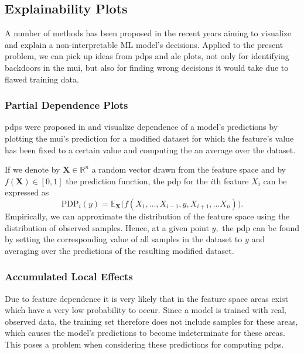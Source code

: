 \documentclass[10pt,sigconf,letterpaper,dvipsnames]{acmart}
\begin{document}
\subsection{Explainability Plots} \label{sec:plots}
A number of methods has been proposed in the recent years aiming to visualize and explain a non-interpretable ML model's decisions.
Applied to the present problem, we can pick up ideas from \glspl{pdp} and \gls{ale} plots, not only for identifying backdoors in the \gls{mui}, but also for finding wrong decisions it would take due to flawed training data.

\subsubsection{Partial Dependence Plots}
\glspl{pdp} were proposed in \cite{friedman_greedy_2001} and visualize dependence of a model's predictions by plotting the \gls{mui}'s prediction for a modified dataset for which the feature's value has been fixed to a certain value and computing the an average over the dataset.

If we denote by $\boldsymbol X \in \mathbb R ^n$ a random vector drawn from the feature space and by $f(\boldsymbol X) \in [0,1]$ the  prediction function, the \gls{pdp} for the $i$th feature $X_i$ can be expressed as
\begin{equation}
\text{PDP}_i(y) = \mathbb E_{\boldsymbol X}\Big(f(X_1,\ldots,X_{i-1},y,X_{i+1},\ldots X_n)\Big) . %
\end{equation}
Empirically, we can approximate the distribution of the feature space using the distribution of observed samples. Hence, at a given point $y,$ the \gls{pdp} can be found by setting the corresponding value of all samples in the dataset to $y$ and averaging over the predictions of the resulting modified dataset.

\subsubsection{Accumulated Local Effects}
Due to feature dependence it is very likely that in the feature space areas exist which have a very low probability to occur. Since a model is trained with real, observed data, the training set therefore does not include samples for these areas, which causes the model's predictions to become indeterminate for these areas. This poses a problem when considering these predictions for computing \glspl{pdp}.
\end{document}
